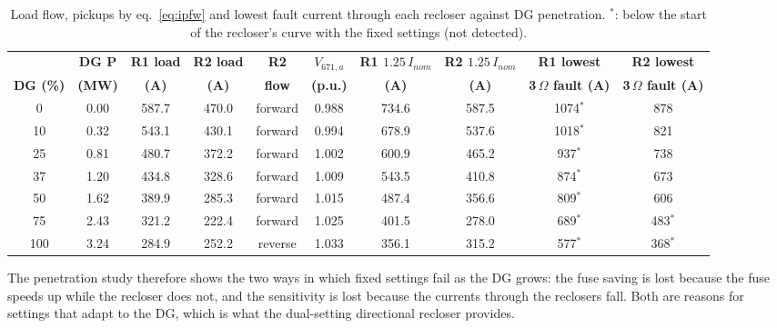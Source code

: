\documentclass[12pt,a4paper]{article}
\begin{document}
\begin{table}[H]
\centering\scriptsize
\setlength{\tabcolsep}{3.5pt}
\begin{tabular}{|c|c|c|c|c|c|c|c|c|c|}
\hline
 & \textbf{DG P} & \textbf{R1 load} & \textbf{R2 load} & \textbf{R2} & \textbf{$V_{671,a}$} & \textbf{R1 $1.25\,I_{nom}$} & \textbf{R2 $1.25\,I_{nom}$} & \textbf{R1 lowest} & \textbf{R2 lowest} \\
\textbf{DG (\%)} & \textbf{(MW)} & \textbf{(A)} & \textbf{(A)} & \textbf{flow} & \textbf{(p.u.)} & \textbf{(A)} & \textbf{(A)} & \textbf{3\,$\Omega$ fault (A)} & \textbf{3\,$\Omega$ fault (A)} \\ \hline
0 & 0.00 & 587.7 & 470.0 & forward & 0.988 & 734.6 & 587.5 & 1074$^\ast$ & 878 \\ \hline
10 & 0.32 & 543.1 & 430.1 & forward & 0.994 & 678.9 & 537.6 & 1018$^\ast$ & 821 \\ \hline
25 & 0.81 & 480.7 & 372.2 & forward & 1.002 & 600.9 & 465.2 & 937$^\ast$ & 738 \\ \hline
37 & 1.20 & 434.8 & 328.6 & forward & 1.009 & 543.5 & 410.8 & 874$^\ast$ & 673 \\ \hline
50 & 1.62 & 389.9 & 285.3 & forward & 1.015 & 487.4 & 356.6 & 809$^\ast$ & 606 \\ \hline
75 & 2.43 & 321.2 & 222.4 & forward & 1.025 & 401.5 & 278.0 & 689$^\ast$ & 483$^\ast$ \\ \hline
100 & 3.24 & 284.9 & 252.2 & reverse & 1.033 & 356.1 & 315.2 & 577$^\ast$ & 368$^\ast$ \\ \hline
\end{tabular}
\caption{Load flow, pickups by eq.~\eqref{eq:ipfw} and lowest fault current through each recloser against DG penetration.
$^\ast$: below the start of the recloser's curve with the fixed settings (not detected).}
\label{tab:penlf}
\end{table}

The penetration study therefore shows the two ways in which fixed settings fail as the DG grows: the fuse
saving is lost because the fuse speeds up while the recloser does not, and the sensitivity is lost because
the currents through the reclosers fall. Both are reasons for settings that adapt to the DG, which is what
the dual-setting directional recloser provides.
\end{document}
